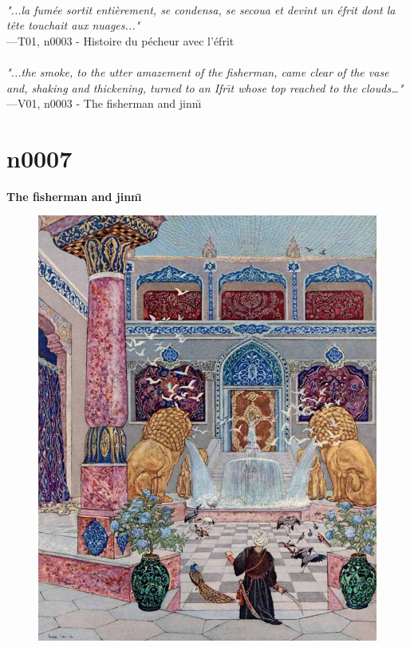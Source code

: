 \documentclass[../Carre_nights.tex]{subfiles}
\begin{document}
\textit{\\
"...la fumée sortit entièrement, se condensa, se secoua et devint un éfrit dont la tête touchait aux nuages..."} \\
—T01, n0003 - Histoire du pécheur avec l’éfrit \\~\\
\textit{"...the smoke, to the utter amazement of the fisherman, came clear of the vase and, shaking and thickening, turned to an Ifr\={\i}t whose top reached to the clouds…"} \\
—V01, n0003 - The fisherman and jinn\={\i}

\newpage

\section{n0007}
\textbf{\Large{The fisherman and jinn\={\i}}} \\

\begin{figure}[ht]
\centering
\includegraphics[height=\figsize]{illustrations/volume_1/T01, n0007 - Histoire du pêcheur avec l'éfrit.jpg}
\end{figure}
\end{document}
